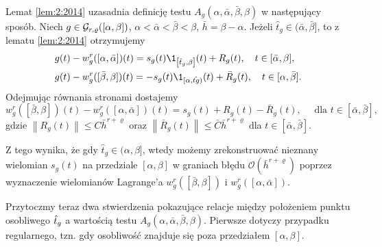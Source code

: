 \documentclass[oik, pdftex, robocza, man]{mgrwms}
\begin{document}
    Lemat \ref{lem:2:2014} uzasadnia definicję testu $A_{g}(\alpha, \bar{\alpha}, \bar{\beta}, \beta)$ w następujący sposób.
    \noindent
    Niech $g \in \mathcal{G}_{r,\varrho}([\alpha,\beta])$, $\alpha<\bar{\alpha}<\bar{\beta}<\beta$, $\bar{h}=\beta-\alpha$. Jeżeli $\hat{t}_{g} \in(\bar{\alpha}, \bar{\beta}]$, to z lematu \ref{lem:2:2014} otrzymujemy
    \begin{equation*}
        \begin{aligned}
            &g(t)-w_{g}^{r}([\alpha, \bar{\alpha}])(t)=s_{g}(t) \1_{\left[\hat{t}_{g}, \beta\right]}(t)+R_{g}(t), \quad t \in[\bar{\alpha}, \beta], \\
            &g(t)-w_{g}^{r}([\bar{\beta}, \beta])(t)=-s_{g}(t) \1_{[\alpha, \hat{t g})}(t)+\bar{R}_{g}(t), \quad t \in[\alpha, \bar{\beta}].
        \end{aligned}
    \end{equation*}
    Odejmując równania stronami dostajemy
    \begin{equation} \label{eq:16}
        w_{g}^{r}([\bar{\beta}, \beta])(t)-w_{g}^{r}([\alpha, \bar{\alpha}])(t)=s_{g}(t)+R_{g}(t)-\bar{R}_{g}(t), \quad \text{ dla }t \in[\bar{\alpha}, \bar{\beta}],
    \end{equation}
    gdzie $\left\|R_{g}(t)\right\| \leq C\bar{h}^{r+\varrho}$ oraz $\left\|\bar{R}_{g}(t)\right\| \leq \bar{C} \bar{h}^{r+\varrho}$ dla $t \in[\bar{\alpha}, \bar{\beta}]$.

    Z tego wynika, że gdy $\hat{t}_{g} \in (\alpha, \beta]$, wtedy możemy zrekonstruować nieznany wielomian $s_{g}(t)$ na przedziale $[\alpha, \beta]$ w graniach błędu $\mathcal{O}(\bar{h}^{r+\varrho})$ poprzez wyznaczenie wielomianów Lagrange'a $w_{g}^{r}([\bar{\beta}, \beta])$ i $w_{g}^{r}([\alpha, \bar{\alpha}])$.

    Przytoczmy teraz dwa stwierdzenia pokazujące relacje między położeniem punktu osobliwego $\hat{t}_{g}$ a wartością testu $A_{g}(\alpha, \bar{\alpha}, \bar{\beta}, \beta)$. Pierwsze dotyczy przypadku regularnego, tzn. gdy osobliwość znajduje się poza przedziałem $[\alpha, \beta]$.
\end{document}

